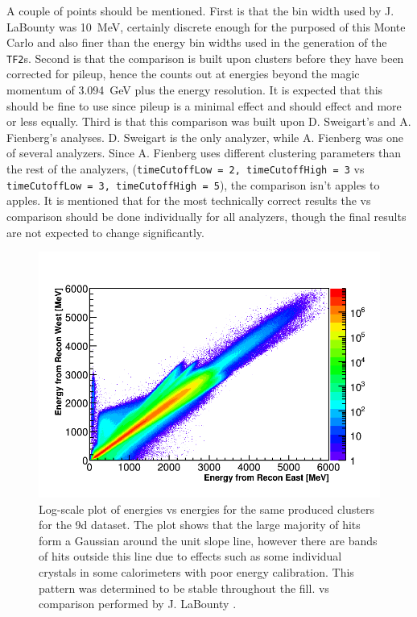 A couple of points should be mentioned. First is that the bin width used by J. LaBounty was \SI{10}{\MeV}, certainly discrete enough for the purposed of this Monte Carlo and also finer than the energy bin widths used in the generation of the \texttt{TF2}s. Second is that the comparison is built upon clusters before they have been corrected for pileup, hence the counts out at energies beyond the magic momentum of \SI{3.094}{\GeV} plus the energy resolution. It is expected that this should be fine to use since pileup is a minimal effect and should effect \RE and \RW more or less equally. Third is that this comparison was built upon D. Sweigart's and A. Fienberg's analyses. D. Sweigart is the only \RE analyzer, while A. Fienberg was one of several \RW analyzers. Since A. Fienberg uses different clustering parameters than the rest of the \RW analyzers, (\texttt{timeCutoffLow = 2, timeCutoffHigh = 3} vs \texttt{timeCutoffLow = 3, timeCutoffHigh = 5}), the comparison isn't apples to apples. It is mentioned that for the most technically correct results the \RE vs \RW comparison should be done individually for all analyzers, though the final results are not expected to change significantly.



\begin{figure}[]
\centering
\includegraphics[width=.7\textwidth]{ReconEastvWest_Energies}
\caption{Log-scale plot of \RE energies vs \RW energies for the same produced clusters for the 9d dataset. The plot shows that the large majority of hits form a Gaussian around the unit slope line, however there are bands of hits outside this line due to effects such as some individual crystals in some calorimeters with poor energy calibration. This pattern was determined to be stable throughout the fill. \RE vs \RW comparison performed by J. LaBounty \cite{JoshEvW}. }
\label{fig:EvWenergies}
\end{figure}

